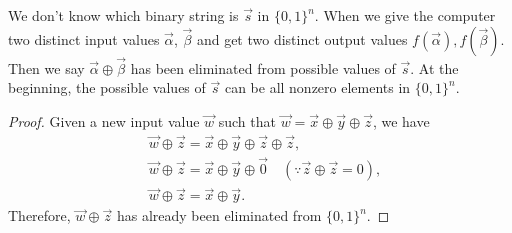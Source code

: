 \begin{mdframed}
We don't know which binary string is $\vec{s}$ in $\{0,1\}^n$. When we give the computer two distinct input values $\vec{\alpha}$, $\vec{\beta}$ and get two distinct output values $f(\vec{\alpha}),f(\vec{\beta})$. Then we say $\vec{\alpha} \oplus \vec{\beta}$ has been eliminated from possible values of $\vec{s}$. At the beginning, the possible values of $\vec{s}$ can be all nonzero elements in $\{0,1\}^n$.
\end{mdframed}

\begin{proof}
Given a new input value $\vec{w}$ such that $\vec{w}=\vec{x} \oplus \vec{y} \oplus \vec{z}$, we have 
$$
\begin{aligned}
	& \vec{w} \oplus \vec{z}=\vec{x} \oplus \vec{y} \oplus \vec{z} \oplus \vec{z}, \\
	& \vec{w} \oplus \vec{z}=\vec{x} \oplus \vec{y} \oplus \vec{0} \quad(\because \vec{z} \oplus \vec{z}=0), \\
	& \vec{w} \oplus \vec{z}=\vec{x} \oplus \vec{y}.
\end{aligned}
$$
Therefore, $\vec{w} \oplus \vec{z}$ has already been eliminated from $\{0,1\}^n$.
\end{proof}

